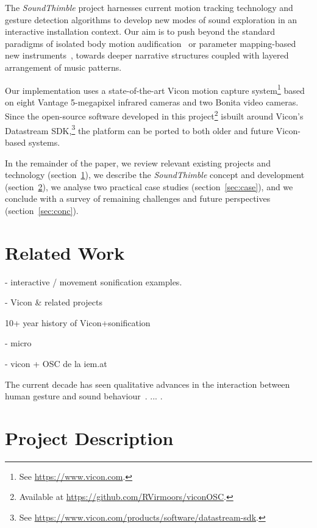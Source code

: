 \documentclass{nime-alternate}
\begin{document}
The \textit{SoundThimble} project harnesses current motion tracking technology and gesture detection algorithms to develop new modes of sound exploration in an interactive installation context. Our aim is to push beyond the standard paradigms of isolated body motion audification~\cite{dobrian2003gestural,kapur2005framework} or parameter mapping-based new instruments~\cite{nymoen2011soundsaber}, towards deeper narrative structures coupled with layered arrangement of music patterns.


Our implementation uses a state-of-the-art Vicon motion capture system\footnote{See  \url{https://www.vicon.com}.} based on eight Vantage 5-megapixel infrared cameras and two Bonita video cameras. Since the open-source software developed in this project\footnote{Available at  \url{https://github.com/RVirmoors/viconOSC}.} is\linebreak built around Vicon's Datastream SDK,\footnote{See  \url{https://www.vicon.com/products/software/datastream-sdk}.} the platform can be ported to both older and future Vicon-based systems.

In the remainder of the paper, we review relevant existing projects and technology (section~\ref{sec:related}), we describe the \textit{SoundThimble} concept and development (section~\ref{sec:proj}), we analyse two practical case studies (section~\ref{sec:case}), and we conclude with a survey of remaining challenges and future perspectives (section~\ref{sec:conc}).


\section{Related Work}
\label{sec:related}


- interactive / movement sonification examples\cite{hermann2011sonification}.

- Vicon \& related projects



10+ year history of Vicon+sonification



- micro

\cite{worrall2013understanding}


- vicon + OSC de la iem.at

The current decade has seen qualitative advances in the interaction between human gesture and sound behaviour~\cite{Gestureanalysis}. ... \cite{probabilisticmodels}.

\section{Project Description}
\label{sec:proj}
\end{document}
